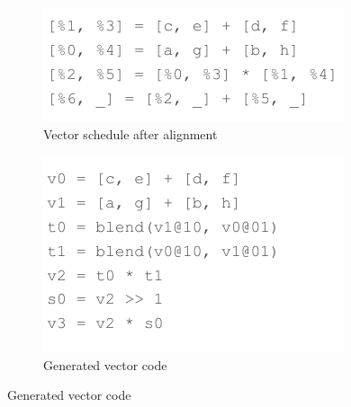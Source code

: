 \begin{figure}
\begin{subfigure}{0.45\columnwidth}
    \end{subfigure}
    \begin{subfigure}{0.55\columnwidth}
        \centering
        \includegraphics[width=0.9\linewidth]{figures/compilation_overview/aligned_schedule.drawio.pdf}
        \vspace{-1em}
        \caption{Vector schedule after alignment}
        \label{fig:aligned-schedule}
    \end{subfigure}
    \begin{subfigure}{0.4\columnwidth}
        \centering
        \includegraphics[width=0.9\linewidth]{figures/compilation_overview/generated_vector_ir.drawio.pdf}
        \vspace{-1em}
        \caption{Generated vector code}

\end{subfigure}
\end{figure}
